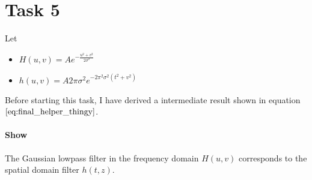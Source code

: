 \documentclass{paper}
\begin{document}
\section*{Task 5}

Let 
\begin{itemize}
    \item $H(u,v) = A e ^{-\frac{u^2 + v^2}{2 \sigma^2}}$ 
    \item $h(u,v) = A 2 \pi \sigma^2 e^{-2 \pi^2 \sigma^2 (t^2 + v^2)}$ 
\end{itemize}


Before starting this task, I have derived a intermediate result shown in equation $\ref{eq:final_helper_thingy}$.

\paragraph{Show} The Gaussian lowpass filter in the frequency domain $H(u,v)$ corresponds to the spatial domain filter $h(t,z)$. \\
\end{document}
